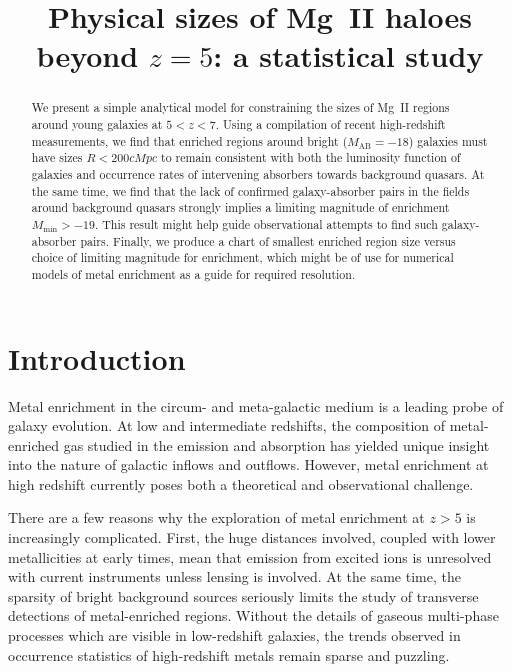 \documentclass[useAMS,usenatbib]{mn2e}
\title{Physical sizes of Mg~II haloes beyond $z=5$: a statistical study}
\date{}
\newcommand{\magtwo}{Mg~{\small II} }
\begin{document}
\maketitle

\begin{abstract}
We present a simple analytical model for constraining the sizes of \magtwo regions around young galaxies at $5<z<7$. Using a compilation of recent high-redshift measurements, we find that enriched regions around bright ($M_\text{AB} = -18$) galaxies must have sizes $R<200 cMpc$ to remain consistent with both the luminosity function of galaxies and occurrence rates of intervening absorbers towards background quasars. At the same time, we find that the lack of confirmed galaxy-absorber pairs in the fields around background quasars strongly implies a limiting magnitude of enrichment $M_\text{min}>-19$. This result might help guide observational attempts to find such galaxy-absorber pairs. Finally, we produce a chart of smallest enriched region size versus choice of limiting magnitude for enrichment, which might be of use for numerical models of metal enrichment as a guide for required resolution.
\end{abstract}

\section{Introduction}


Metal enrichment in the circum- and meta-galactic medium is a leading probe of galaxy evolution.
At low and intermediate redshifts, the composition of metal-enriched gas studied in the emission and absorption has yielded unique insight into the nature of galactic inflows and outflows.  
However, metal enrichment at high redshift currently poses both a theoretical and observational challenge. 

There are a few reasons why the exploration of metal enrichment at $z>5$ is increasingly complicated. First, the huge distances involved, coupled with lower metallicities at early times, mean that emission from excited ions is unresolved with current instruments unless lensing is involved. At the same time, the sparsity of bright background sources seriously limits the study of transverse detections of metal-enriched regions. Without the details of gaseous multi-phase processes which are visible in low-redshift galaxies, the trends observed in occurrence statistics of high-redshift metals remain sparse and puzzling.
\end{document}
